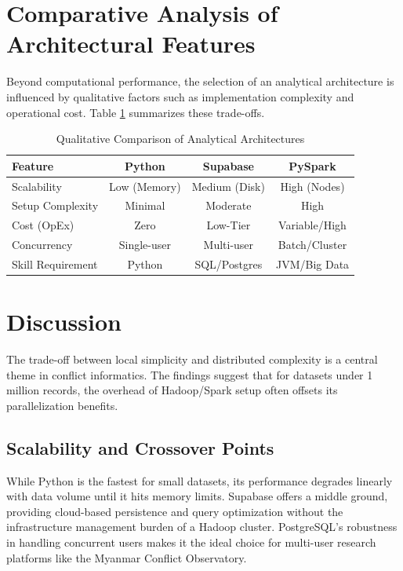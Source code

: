\documentclass[conference]{IEEEtran}
\begin{document}
\section{Comparative Analysis of Architectural Features}

Beyond computational performance, the selection of an analytical architecture is influenced by qualitative factors such as implementation complexity and operational cost. Table \ref{tab:features} summarizes these trade-offs.

\begin{table}[h]
\centering
\caption{Qualitative Comparison of Analytical Architectures}
\label{tab:features}
\begin{tabular}{lccc}
\hline
\textbf{Feature} & \textbf{Python} & \textbf{Supabase} & \textbf{PySpark} \\
\hline
Scalability      & Low (Memory)    & Medium (Disk)     & High (Nodes)     \\
Setup Complexity & Minimal         & Moderate          & High             \\
Cost (OpEx)      & Zero            & Low-Tier          & Variable/High    \\
Concurrency      & Single-user     & Multi-user        & Batch/Cluster    \\
Skill Requirement& Python          & SQL/Postgres      & JVM/Big Data     \\
\hline
\end{tabular}
\end{table}

\section{Discussion}

The trade-off between local simplicity and distributed complexity is a central theme in conflict informatics. The findings suggest that for datasets under 1 million records, the overhead of Hadoop/Spark setup often offsets its parallelization benefits.

\subsection{Scalability and Crossover Points}
While Python is the fastest for small datasets, its performance degrades linearly with data volume until it hits memory limits. Supabase offers a middle ground, providing cloud-based persistence and query optimization without the infrastructure management burden of a Hadoop cluster. PostgreSQL's robustness in handling concurrent users makes it the ideal choice for multi-user research platforms like the Myanmar Conflict Observatory.
\end{document}
